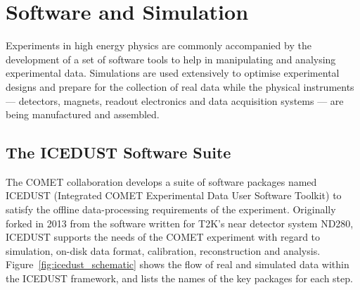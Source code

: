 \chapter{Software and Simulation}
\label{ch:software}

\newcommand{\SimG}{\texttt{SimG4}\xspace}
\newcommand{\oaEvent}{\texttt{oaEvent}\xspace}
\newcommand{\Geant}{{\sc Geant4}\xspace}


 
    
    
    



Experiments in high energy physics are commonly accompanied by the development
of a set of software tools to help in manipulating and analysing experimental
data. Simulations are used extensively to optimise experimental designs and
prepare for the collection of real data while the physical instruments ---
detectors, magnets, readout electronics and data acquisition systems --- are
being manufactured and assembled.

\section{The ICEDUST Software Suite}
The COMET collaboration develops a suite of software packages named ICEDUST
(Integrated COMET Experimental Data User Software Toolkit) to satisfy the
offline data-processing requirements of the experiment. Originally forked in
2013 from the software written for T2K's near detector system ND280, ICEDUST
supports the needs of the COMET experiment with regard to simulation, on-disk
data format, calibration, reconstruction and analysis.
Figure~\ref{fig:icedust_schematic} shows the flow of real and simulated data
within the ICEDUST framework, and lists the names of the key packages for each
step.


